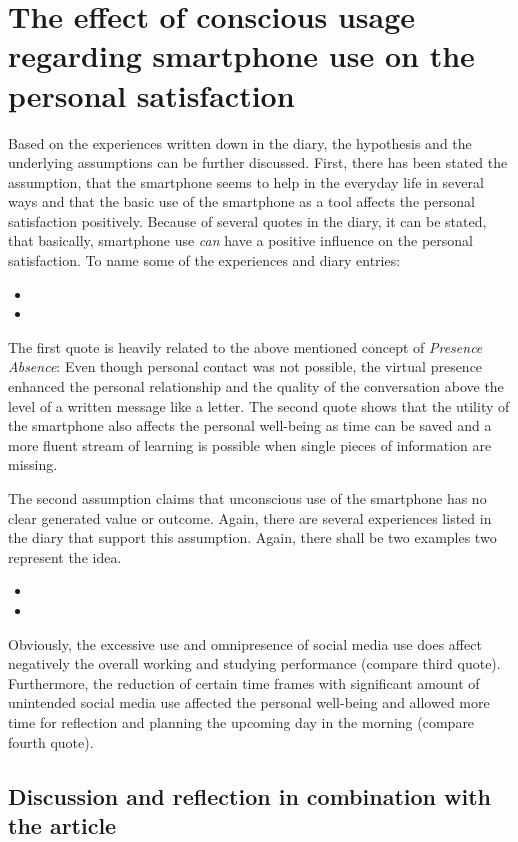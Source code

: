 \documentclass[11pt,letterpaper]{article}
\begin{document}
\section*{The effect of conscious usage regarding smartphone use on the personal satisfaction}
Based on the experiences written down in the diary, the hypothesis and the underlying assumptions can be further discussed. First, there has been stated the assumption, that the smartphone seems to help in the everyday life in several ways and that the basic use of the smartphone as a tool affects the personal satisfaction positively. Because of several quotes in the diary, it can be stated, that basically, smartphone use \textit{can} have a positive influence on the personal satisfaction. To name some of the experiences and diary entries:
\begin{itemize}
\item {}
\item {}
\end{itemize}

The first quote is heavily related to the above mentioned concept of \textit{Presence Absence}: Even though personal contact was not possible, the virtual presence enhanced the personal relationship and the quality of the conversation above the level of a written message like a letter. The second quote shows that the utility of the smartphone also affects the personal well-being as time can be saved and a more fluent stream of learning is possible when single pieces of information are missing.

The second assumption claims that unconscious use of the smartphone has no clear generated value or outcome. Again, there are several experiences listed in the diary that support this assumption. Again, there shall be two examples two represent the idea.

\begin{itemize}
\item {}
\item {}
\end{itemize}

Obviously, the excessive use and omnipresence of social media use does affect negatively the overall working and studying performance (compare third quote). Furthermore, the reduction of certain time frames with significant amount of unintended social media use affected the personal well-being and allowed more time for reflection and planning the upcoming day in the morning (compare fourth quote).

\subsection*{Discussion and reflection in combination with the article}

\newpage





\printbibliography 
\end{document}
